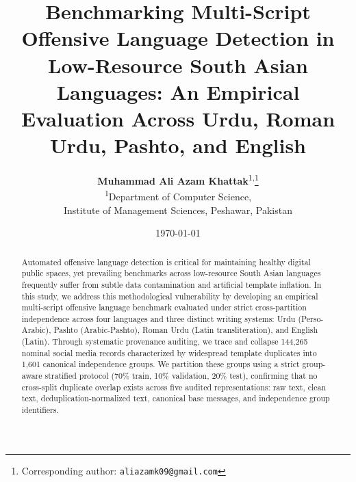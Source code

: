 \documentclass[11pt,a4paper]{article}
\title{\textbf{Benchmarking Multi-Script Offensive Language Detection in Low-Resource South Asian Languages: An Empirical Evaluation Across Urdu, Roman Urdu, Pashto, and English}}
\author{
  \textbf{Muhammad Ali Azam Khattak}\textsuperscript{1,}\footnote{Corresponding author: \texttt{aliazamk09@gmail.com}} \\[0.4em]
  \textsuperscript{1}Department of Computer Science, \\
  Institute of Management Sciences, Peshawar, Pakistan
}
\date{\today}
\begin{document}
\maketitle

\begin{abstract}
Automated offensive language detection is critical for maintaining healthy digital public spaces, yet prevailing benchmarks across low-resource South Asian languages frequently suffer from subtle data contamination and artificial template inflation. In this study, we address this methodological vulnerability by developing an empirical multi-script offensive language benchmark evaluated under strict cross-partition independence across four languages and three distinct writing systems: Urdu (Perso-Arabic), Pashto (Arabic-Pashto), Roman Urdu (Latin transliteration), and English (Latin). Through systematic provenance auditing, we trace and collapse 144,265 nominal social media records characterized by widespread template duplicates into 1,601 canonical independence groups. We partition these groups using a strict group-aware stratified protocol (70\% train, 10\% validation, 20\% test), confirming that no cross-split duplicate overlap exists across five audited representations: raw text, clean text, deduplication-normalized text, canonical base messages, and independence group identifiers.


\end{abstract}
\end{document}
